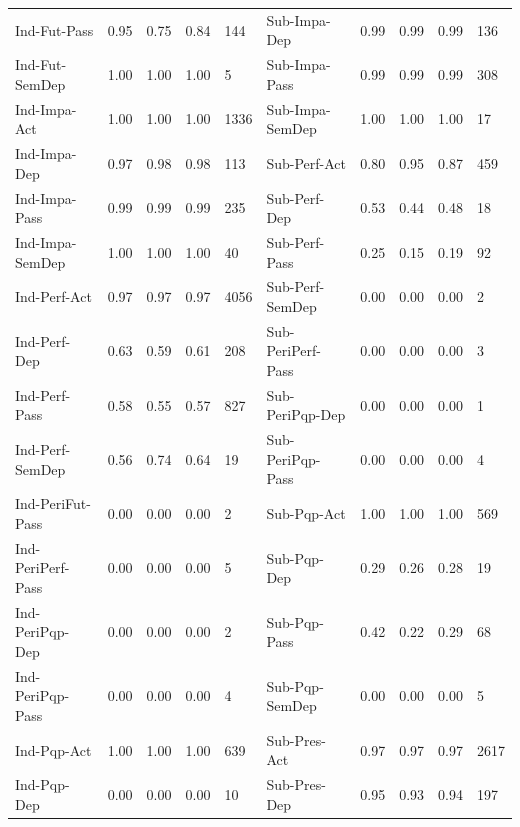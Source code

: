 \begin{table}[h]
{\begin{tabular}{@{}l|llll||l|llll@{}}
 Ind-Fut-Pass      & 0.95      & 0.75   & 0.84     & 144     & Sub-Impa-Dep      & 0.99      & 0.99   & 0.99     & 136     \\ 
 Ind-Fut-SemDep    & 1.00      & 1.00   & 1.00     & 5       & Sub-Impa-Pass     & 0.99      & 0.99   & 0.99     & 308     \\ 
 Ind-Impa-Act      & 1.00      & 1.00   & 1.00     & 1336    & Sub-Impa-SemDep   & 1.00      & 1.00   & 1.00     & 17      \\ 
 Ind-Impa-Dep      & 0.97      & 0.98   & 0.98     & 113     & Sub-Perf-Act      & 0.80      & 0.95   & 0.87     & 459     \\ 
 Ind-Impa-Pass     & 0.99      & 0.99   & 0.99     & 235     & Sub-Perf-Dep      & 0.53      & 0.44   & 0.48     & 18      \\ 
 Ind-Impa-SemDep   & 1.00      & 1.00   & 1.00     & 40      & Sub-Perf-Pass     & 0.25      & 0.15   & 0.19     & 92      \\ 
 Ind-Perf-Act      & 0.97      & 0.97   & 0.97     & 4056    & Sub-Perf-SemDep   & 0.00      & 0.00   & 0.00     & 2       \\ 
 Ind-Perf-Dep      & 0.63      & 0.59   & 0.61     & 208     & Sub-PeriPerf-Pass & 0.00      & 0.00   & 0.00     & 3       \\ 
 Ind-Perf-Pass     & 0.58      & 0.55   & 0.57     & 827     & Sub-PeriPqp-Dep   & 0.00      & 0.00   & 0.00     & 1       \\ 
 Ind-Perf-SemDep   & 0.56      & 0.74   & 0.64     & 19      & Sub-PeriPqp-Pass  & 0.00      & 0.00   & 0.00     & 4       \\ 
 Ind-PeriFut-Pass  & 0.00      & 0.00   & 0.00     & 2       & Sub-Pqp-Act       & 1.00      & 1.00   & 1.00     & 569     \\ 
 Ind-PeriPerf-Pass & 0.00      & 0.00   & 0.00     & 5       & Sub-Pqp-Dep       & 0.29      & 0.26   & 0.28     & 19      \\ 
 Ind-PeriPqp-Dep   & 0.00      & 0.00   & 0.00     & 2       & Sub-Pqp-Pass      & 0.42      & 0.22   & 0.29     & 68      \\ 
 Ind-PeriPqp-Pass  & 0.00      & 0.00   & 0.00     & 4       & Sub-Pqp-SemDep    & 0.00      & 0.00   & 0.00     & 5       \\ 
 Ind-Pqp-Act       & 1.00      & 1.00   & 1.00     & 639     & Sub-Pres-Act      & 0.97      & 0.97   & 0.97     & 2617    \\ 
 Ind-Pqp-Dep       & 0.00      & 0.00   & 0.00     & 10      & Sub-Pres-Dep      & 0.95      & 0.93   & 0.94     & 197     \\ 

\end{tabular}}
\end{table}
